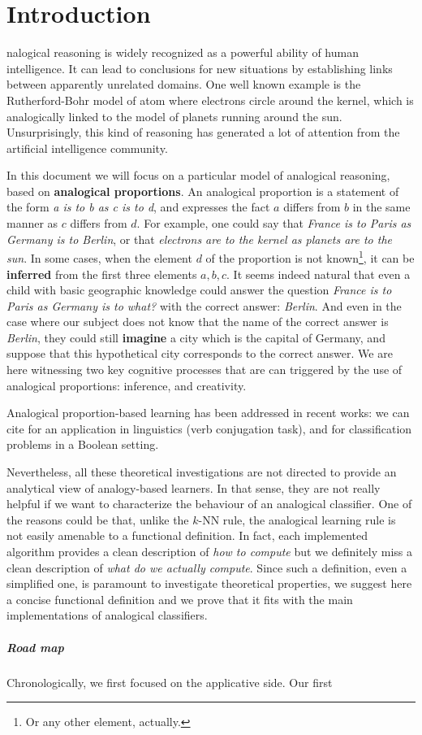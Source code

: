 \chapter*{Introduction}
nalogical reasoning is widely recognized as a powerful ability of
human intelligence.  It can lead to conclusions for new situations by
establishing links between apparently unrelated domains. One well known example
is the Rutherford-Bohr model of atom where electrons circle around the kernel,
which is analogically linked to the model of planets running around the sun.
Unsurprisingly, this kind of reasoning has generated a lot of attention from
the artificial intelligence community.

In this document we will focus on a particular model of analogical reasoning,
based on \textbf{analogical proportions}. An analogical proportion is a
statement of the form \textit{a is to b as c is to d}, and expresses the fact
$a$ differs from $b$ in the same manner as $c$ differs from $d$. For example,
one could say that \textit{France is to Paris as Germany is to Berlin}, or that
\textit{electrons are to the kernel as planets are to the sun}. In some cases,
when the element $d$ of the proportion is not known\footnote{Or any other
element, actually.}, it can be \textbf{inferred} from the first three elements
$a, b, c$. It seems indeed natural that even a child with basic geographic
knowledge could answer the question \textit{France is to Paris as Germany is to
what?} with the correct answer: \textit{Berlin}. And even in the case where our
subject does not know that the name of the correct answer is \textit{Berlin},
they could still \textbf{imagine} a city  which is the capital of Germany, and
suppose that this hypothetical city corresponds to the correct answer. We are
here witnessing two key cognitive processes that are can triggered by the use
of analogical proportions: inference, and creativity.

Analogical proportion-based learning has been addressed in recent works: we can
cite \cite{StrYvoCNLL05} for an application in linguistics (verb conjugation
task), and \cite{BayMicDelIJCAI07} for classification problems in a Boolean
setting.

Nevertheless, all these theoretical investigations are not directed to provide
an analytical view of analogy-based learners. In that sense, they are not
really helpful if we want to characterize the behaviour of an analogical
classifier. One of the reasons could be that, unlike the $k$-NN
rule, the analogical learning rule is not easily amenable to a functional
definition. In fact, each implemented algorithm  provides a clean description
of {\it how to compute} but we definitely miss a clean description of {\it what
do we actually compute}.  Since such a definition, even a simplified one, is
paramount to investigate theoretical properties, we suggest here a concise
functional definition and we prove that it fits with the main implementations
of analogical classifiers.

\paragraph{Road map\\}

Chronologically, we first focused on the applicative side. Our first

